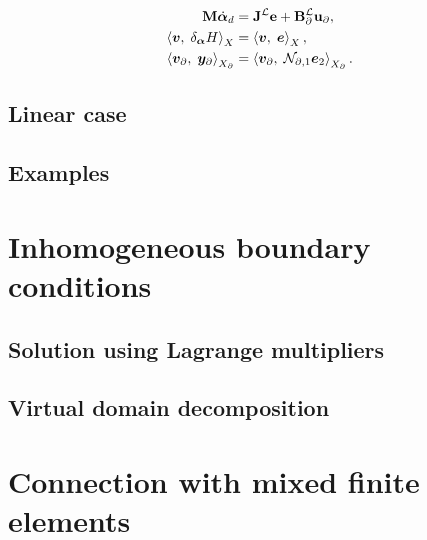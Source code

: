 \begin{equation}
\begin{aligned}
\mathbf{M}\dot{\bm{\alpha}}_d &= \mathbf{J}^{\mathcal{L}} \mathbf{e} + \mathbf{B}^{\mathcal{L}}_\partial \mathbf{u}_\partial, \\
\inner[X]{\bm{v}}{\delta_{\bm{\alpha}} H} &= \inner[X]{\bm{v}}{\bm{e}}, \\
\inner[X_\partial]{\bm{v}_\partial}{\bm{y}_\partial} &= \inner[X_\partial]{\bm{v}_\partial}{\mathcal{N}_{\partial, 1}\bm{e}_2}.
\end{aligned}
\end{equation}

\subsection{Linear case}

\subsection{Examples}

\section{Inhomogeneous boundary conditions}\label{sec:mixedbc}

\subsection{Solution using Lagrange multipliers}

\subsection{Virtual domain decomposition}


\section{Connection with mixed finite elements}





